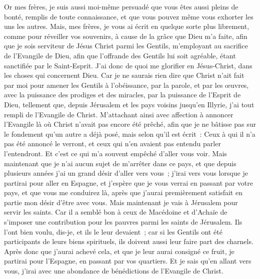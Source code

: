 \begin{multicols}{2}
 Or mes frères, je suis aussi moi-même persuadé que vous êtes aussi pleins de bonté, remplis de toute connaissance, et que vous pouvez même vous exhorter les uns les autres.
Mais, mes frères, je vous ai écrit en quelque sorte plus librement, comme pour réveiller vos souvenirs, à cause de la grâce que Dieu m'a faite,
afin que je sois serviteur de Jésus Christ parmi les Gentils, m'employant au sacrifice de l'Evangile de Dieu, afin que l'offrande des Gentils lui soit agréable, étant sanctifiée par le Saint-Esprit.
J'ai donc de quoi me glorifier en Jésus-Christ, dans les choses qui concernent Dieu.
Car je ne saurais rien dire que Christ n'ait fait par moi pour amener les Gentils à l'obéissance, par la parole, et par les œuvres,
avec la puissance des prodiges et des miracles, par la puissance de l'Esprit de Dieu, tellement que, depuis Jérusalem et les pays voisins jusqu'en Illyrie, j'ai tout rempli de l'Evangile de Christ.
M'attachant ainsi avec affection à annoncer l'Evangile là où Christ n'avait pas encore été prêché, afin que je ne bâtisse pas sur le fondement qu'un autre a déjà posé,
mais selon qu'il est écrit~: Ceux à qui il n'a pas été annoncé le verront, et ceux qui n'en avaient pas entendu parler l'entendront.
Et c'est ce qui m'a souvent empêché d'aller vous voir.
Mais maintenant que je n'ai aucun sujet de m'arrêter dans ce pays, et que depuis plusieurs années j'ai un grand désir d'aller vers vous~;
j'irai vers vous lorsque je partirai pour aller en Espagne, et j'espère que je vous verrai en passant par votre pays, et que vous me conduirez là, après que j'aurai premièrement satisfait en partie mon désir d'être avec vous.
Mais maintenant je vais à Jérusalem pour servir les saints.
Car il a semblé bon à ceux de Macédoine et d'Achaïe de s'imposer une contribution pour les pauvres parmi les saints de Jérusalem.
Ils l'ont bien voulu, dis-je, et ils le leur devaient~; car si les Gentils ont été participants de leurs biens spirituels, ils doivent aussi leur faire part des charnels.
Après donc que j'aurai achevé cela, et que je leur aurai consigné ce fruit, je partirai pour l'Espagne, en passant par vos quartiers.
Et je sais qu'en allant vers vous, j'irai avec une abondance de bénédictions de l'Evangile de Christ.

\end{multicols}
